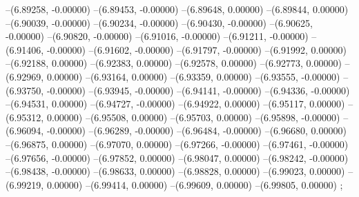 --(6.89258, -0.00000)
--(6.89453, -0.00000)
--(6.89648, 0.00000)
--(6.89844, 0.00000)
--(6.90039, -0.00000)
--(6.90234, -0.00000)
--(6.90430, -0.00000)
--(6.90625, -0.00000)
--(6.90820, -0.00000)
--(6.91016, -0.00000)
--(6.91211, -0.00000)
--(6.91406, -0.00000)
--(6.91602, -0.00000)
--(6.91797, -0.00000)
--(6.91992, 0.00000)
--(6.92188, 0.00000)
--(6.92383, 0.00000)
--(6.92578, 0.00000)
--(6.92773, 0.00000)
--(6.92969, 0.00000)
--(6.93164, 0.00000)
--(6.93359, 0.00000)
--(6.93555, -0.00000)
--(6.93750, -0.00000)
--(6.93945, -0.00000)
--(6.94141, -0.00000)
--(6.94336, -0.00000)
--(6.94531, 0.00000)
--(6.94727, -0.00000)
--(6.94922, 0.00000)
--(6.95117, 0.00000)
--(6.95312, 0.00000)
--(6.95508, 0.00000)
--(6.95703, 0.00000)
--(6.95898, -0.00000)
--(6.96094, -0.00000)
--(6.96289, -0.00000)
--(6.96484, -0.00000)
--(6.96680, 0.00000)
--(6.96875, 0.00000)
--(6.97070, 0.00000)
--(6.97266, -0.00000)
--(6.97461, -0.00000)
--(6.97656, -0.00000)
--(6.97852, 0.00000)
--(6.98047, 0.00000)
--(6.98242, -0.00000)
--(6.98438, -0.00000)
--(6.98633, 0.00000)
--(6.98828, 0.00000)
--(6.99023, 0.00000)
--(6.99219, 0.00000)
--(6.99414, 0.00000)
--(6.99609, 0.00000)
--(6.99805, 0.00000)
;
